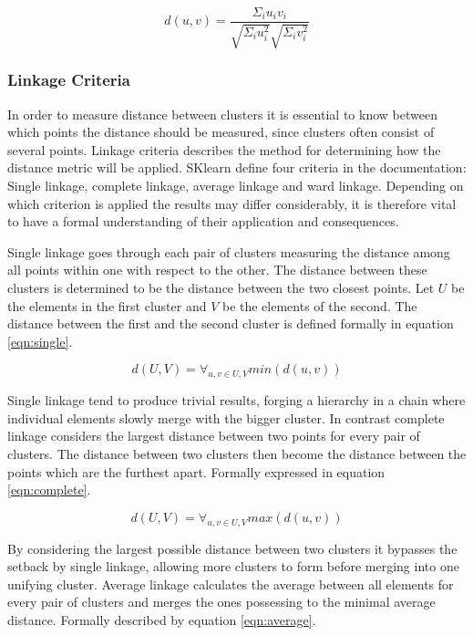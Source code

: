 \begin{equation}
\label{eqn:cosine}
d(u, v) = \frac{\Sigma_i u_iv_i}{\sqrt{\Sigma_i u_i^2}\sqrt{\Sigma_i v_i^2}}
\end{equation}

\subsubsection{Linkage Criteria}
In order to measure distance between clusters it is essential to know between which points the distance should be measured, since clusters often consist of several points. Linkage criteria describes the method for determining how the distance metric will be applied. SKlearn define four criteria in the documentation\cite{scikit}: Single linkage, complete linkage, average linkage and ward linkage. Depending on which criterion is applied the results may differ considerably, it is therefore vital to have a formal understanding of their application and consequences.

Single linkage goes through each pair of clusters measuring the distance among all points within one with respect to the other. The distance between these clusters is determined to be the distance between the two closest points. Let $U$ be the elements in the first cluster and $V$ be the elements of the second. The distance between the first and the second cluster is defined formally in equation \ref{eqn:single}.

\begin{equation}
\label{eqn:single}
d(U, V) = \forall_{u, v \in U, V} min(d(u, v))
\end{equation}

Single linkage tend to produce trivial results, forging a hierarchy in a chain where individual elements slowly merge with the bigger cluster. In contrast complete linkage considers the largest distance between two points for every pair of clusters. The distance between two clusters then become the distance between the points which are the furthest apart. Formally expressed in equation \ref{eqn:complete}.

\begin{equation}
\label{eqn:complete}
d(U, V) = \forall_{u, v \in U, V} max(d(u, v))
\end{equation}

By considering the largest possible distance between two clusters it bypasses the setback by single linkage, allowing more clusters to form before merging into one unifying cluster. Average linkage calculates the average between all elements for every pair of clusters and merges the ones possessing to the minimal average distance. Formally described by equation \ref{eqn:average}.

